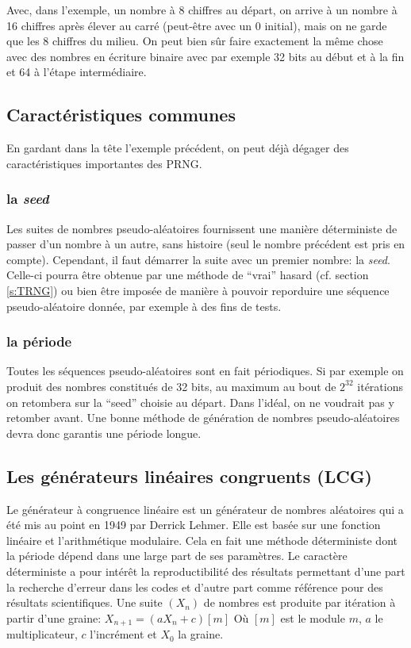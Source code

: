 \documentclass{scrartcl}
\begin{document}
Avec, dans l'exemple, un nombre à 8 chiffres au départ, on arrive à un nombre à
16 chiffres après élever au carré (peut-être avec un 0 initial), mais on ne
garde que les 8 chiffres du milieu. On peut bien sûr faire exactement la même
chose avec des nombres en écriture binaire avec par exemple 32 bits au début et
à la fin et 64 à l'étape intermédiaire.

\subsection{Caractéristiques communes}
En gardant dans la tête l'exemple précédent, on peut déjà dégager des
caractéristiques importantes des PRNG.
\subsubsection{la \textit{seed}}
Les suites de nombres pseudo-aléatoires fournissent une manière déterministe de
passer d'un nombre à un autre, sans histoire (seul le nombre précédent est pris
en compte). Cependant, il faut démarrer la suite avec un premier nombre: la
\textit{seed}. Celle-ci pourra être obtenue par une méthode de ``vrai'' hasard
(cf. section \ref{s:TRNG}) ou bien être imposée de manière à pouvoir reporduire
une séquence pseudo-aléatoire donnée, par exemple à des fins de tests.
\subsubsection{la période}
Toutes les séquences pseudo-aléatoires sont en fait périodiques. Si par exemple
on produit des nombres constitués de 32 bits, au maximum au bout de $2^{32}$
itérations on retombera sur la ``seed'' choisie au départ. Dans l'idéal, on ne
voudrait pas y retomber avant. Une bonne méthode de génération de nombres
pseudo-aléatoires devra donc garantis une période longue.

\subsection{Les générateurs linéaires congruents (LCG)}
Le générateur à congruence linéaire est un générateur de nombres aléatoires qui
a été mis au point en 1949 par Derrick Lehmer. Elle est basée sur une fonction
linéaire et l'arithmétique modulaire. Cela en fait une méthode déterministe dont
la période dépend dans une large part de ses paramètres.  Le caractère
déterministe a pour intérêt la reproductibilité des résultats permettant d'une
part la recherche d'erreur dans les codes et d'autre part comme référence pour
des résultats scientifiques.  Une suite $(X_n)$ de nombres est produite par
itération à partir d'une graine: $X_{n+1} = (a X_n +c)[m]$ Où $[m]$ est le
module $m$, $a$ le multiplicateur, $c$ l'incrément et $X_0$ la graine.
\end{document}
